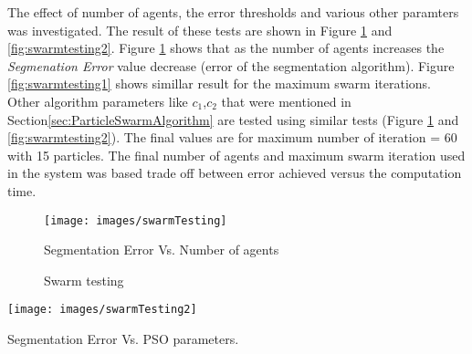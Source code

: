  The effect of number of agents, the error thresholds and various other paramters was investigated. The result of these tests are shown in Figure \ref{fig:swarmtesting} and  \ref{fig:swarmtesting2}. Figure \ref{fig:swarmtesting} shows that as the number of agents increases the \textit{Segmenation Error} value decrease (error of the segmentation algorithm). Figure \ref{fig:swarmtesting1} shows simillar result for the maximum swarm iterations. Other algorithm parameters like $c_1$,$c_2$ that were mentioned in Section\ref{sec:ParticleSwarmAlgorithm} are tested using similar tests (Figure \ref{fig:swarmtesting} and \ref{fig:swarmtesting2}). The final values are for maximum number of iteration = 60 with 15 particles. The final number of agents and maximum swarm iteration used in the system was based trade off between error achieved versus the computation time. 
    
 \begin{figure}
	\centering		
	 \texttt{[image: images/swarmTesting]}
	 	\caption{Swarm testing} Segmentation Error Vs. Number of agents
	 	\label{fig:swarmtesting}
\end{figure} 

\begin{figure*}
	\centering		
	 \texttt{[image: images/swarmTesting2]}
	 	\caption{Swarm testing} Segmentation Error Vs. PSO parameters.
	 	\label{fig:swarmtesting2}
	
\end{figure*} 




